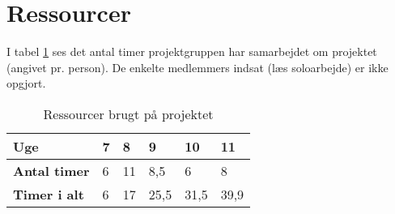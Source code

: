 \section{Ressourcer}
I tabel \ref{table:ressourcer} ses det antal timer projektgruppen har samarbejdet om projektet (angivet pr. person). De enkelte medlemmers indsat (læs soloarbejde) er ikke opgjort.\\

\begin{table}[ht]
    \centering
    \begin{tabular}{|p{3cm}|p{1cm}|p{1cm}|p{1cm}|p{1cm}|p{1cm}|} 
        \hline
        \textbf{Uge}         & \textbf{7} & \textbf{8} & \textbf{9} & \textbf{10} & \textbf{11}  \\ 
        \hline
        \textbf{Antal timer} & 6          & 11         & 8,5        & 6           & 8            \\ 
        \hline
        \textbf{Timer i alt} & 6          & 17         & 25,5       & 31,5        & 39,9         \\
        \hline
    \end{tabular}
    \caption{Ressourcer brugt på projektet}
    \label{table:ressourcer}
\end{table}
